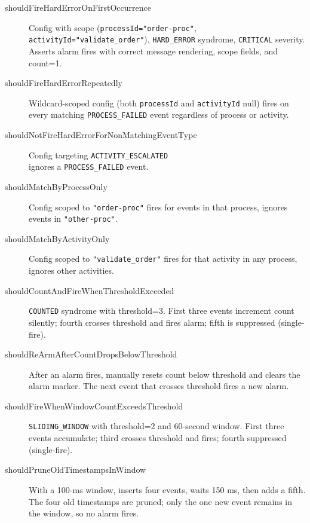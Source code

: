 \begin{description}

\item[shouldFireHardErrorOnFirstOccurrence] Config with scope
(\texttt{processId="order-proc"}, \\ \texttt{activityId="validate\_order"}),
\texttt{HARD\_ERROR} syndrome, \texttt{CRITICAL} severity. Asserts alarm
fires with correct message rendering, scope fields, and count=1.

\item[shouldFireHardErrorRepeatedly] Wildcard-scoped config (both
\texttt{processId} and \texttt{activityId} null) fires on every matching
\texttt{PROCESS\_FAILED} event regardless of process or activity.

\item[shouldNotFireHardErrorForNonMatchingEventType] Config targeting
\texttt{ACTIVITY\_ESCALATED} \\ ignores a \texttt{PROCESS\_FAILED} event.

\item[shouldMatchByProcessOnly] Config scoped to \texttt{"order-proc"}
fires for events in that process, ignores events in \texttt{"other-proc"}.

\item[shouldMatchByActivityOnly] Config scoped to
\texttt{"validate\_order"} fires for that activity in any process, ignores
other activities.

\item[shouldCountAndFireWhenThresholdExceeded] \texttt{COUNTED} syndrome
with threshold=3. First three events increment count silently; fourth
crosses threshold and fires alarm; fifth is suppressed (single-fire).

\item[shouldReArmAfterCountDropsBelowThreshold] After an alarm fires,
manually resets count below threshold and clears the alarm marker. The
next event that crosses threshold fires a new alarm.

\item[shouldFireWhenWindowCountExceedsThreshold] \texttt{SLIDING\_WINDOW}
with threshold=2 and 60-second window. First three events accumulate;
third crosses threshold and fires; fourth suppressed (single-fire).

\item[shouldPruneOldTimestampsInWindow] With a 100-ms window, inserts
four events, waits 150 ms, then adds a fifth. The four old timestamps
are pruned; only the one new event remains in the window, so no alarm
fires.


\end{description}
